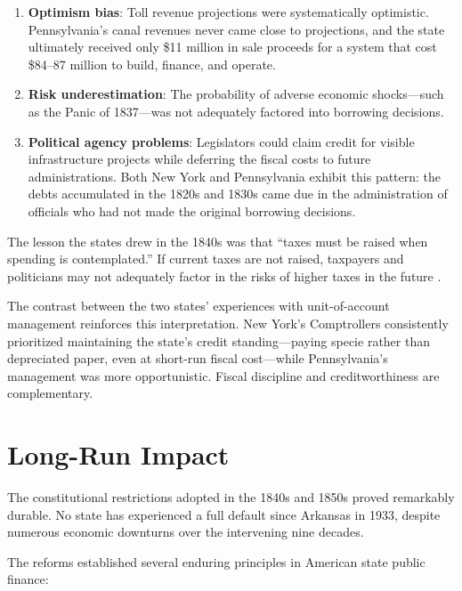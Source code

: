 \documentclass[11pt]{article}
\begin{document}
\begin{enumerate}
  \item \textbf{Optimism bias}: Toll revenue projections were systematically
    optimistic.  Pennsylvania's canal revenues never came close to projections,
    and the state ultimately received only \$11 million in sale proceeds for
    a system that cost \$84--87 million to build, finance, and operate.

  \item \textbf{Risk underestimation}: The probability of adverse economic
    shocks---such as the Panic of 1837---was not adequately factored into
    borrowing decisions.

  \item \textbf{Political agency problems}: Legislators could claim credit for
    visible infrastructure projects while deferring the fiscal costs to future
    administrations.  Both New York and Pennsylvania exhibit this pattern:
    the debts accumulated in the 1820s and 1830s came due in the administration
    of officials who had not made the original borrowing decisions.
\end{enumerate}

The lesson the states drew in the 1840s was that ``taxes must be raised when
spending is contemplated.''  If current taxes are not raised, taxpayers and
politicians may not adequately factor in the risks of higher taxes in the
future \citep{grinath1997debt}.

The contrast between the two states' experiences with unit-of-account management
reinforces this interpretation.  New York's Comptrollers consistently prioritized
maintaining the state's credit standing---paying specie rather than depreciated
paper, even at short-run fiscal cost---while Pennsylvania's management was more
opportunistic.  Fiscal discipline and creditworthiness are complementary.

\section{Long-Run Impact}
\label{sec:longrun}

The constitutional restrictions adopted in the 1840s and 1850s proved
remarkably durable.  No state has experienced a full default since Arkansas in
1933, despite numerous economic downturns over the intervening nine decades.

The reforms established several enduring principles in American state public
finance:
\end{document}
